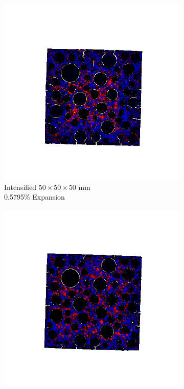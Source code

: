 \begin{figure}[ht!]
    \begin{subfigure}{.3\textwidth}
      \centering
      \includegraphics[width=.9\linewidth]{Files/exp_3D/DEF/A30X0C_3_stress.png}
    \caption{Intensified $50 \times 50 \times 50$ mm \\  0.5795\% Expansion}
    \end{subfigure}%
    \begin{subfigure}{.3\textwidth}
      \centering
      \includegraphics[width=.9\linewidth]{Files/exp_3D/DEF/A30X-5C_3_stress.png}

\end{subfigure}
\end{figure}
